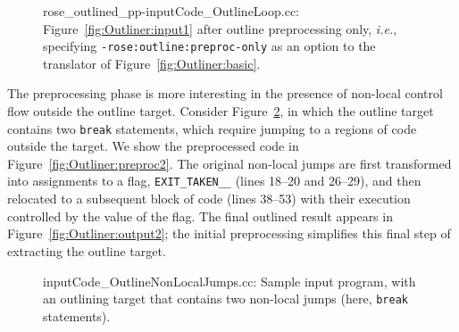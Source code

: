 \begin{figure}[!h]
{\indent
{\mySmallFontSize
\begin{latexonly}
   
\end{latexonly}
\begin{htmlonly}
   
\end{htmlonly}

}
}
\caption{rose\_outlined\_pp-inputCode\_OutlineLoop.cc:
Figure~\ref{fig:Outliner:input1} after outline preprocessing only,
\emph{i.e.}, specifying \texttt{-rose:outline:preproc-only} as an
option to the translator of Figure~\ref{fig:Outliner:basic}.}
\label{fig:Outliner:preproc1}
\end{figure}

The preprocessing phase is more interesting in the presence of
non-local control flow outside the outline target. Consider
Figure~\ref{fig:Outliner:input2}, in which the outline target
contains two \texttt{break} statements, which require jumping to a
regions of code outside the target. We show the preprocessed code in
Figure~\ref{fig:Outliner:preproc2}. The original non-local jumps
are first transformed into assignments to a flag,
\texttt{EXIT\_TAKEN\_\_} (lines 18--20 and 26--29), and then relocated
to a subsequent block of code (lines 38--53) with their execution
controlled by the value of the flag. The final outlined result appears
in Figure~\ref{fig:Outliner:output2}; the initial preprocessing
simplifies this final step of extracting the outline target.

\begin{figure}[!h]
{\indent
{\mySmallFontSize
\begin{latexonly}
   
\end{latexonly}
\begin{htmlonly}
   
\end{htmlonly}

}
}
\caption{inputCode\_OutlineNonLocalJumps.cc: Sample input program,
with an outlining target that contains two non-local jumps (here,
\texttt{break} statements).}
\label{fig:Outliner:input2}
\end{figure}

